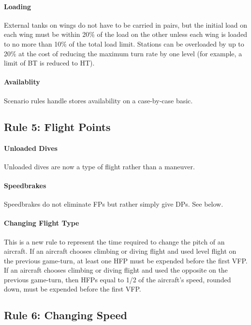 \documentclass[10pt]{article}
\begin{document}
\paragraph{Loading} External tanks on wings do not have to be carried in pairs, but the initial load on each wing must be within 20\% of the load on the other unless each wing is loaded to no more than 10\% of the total load limit. Stations can be overloaded by up to 20\% at the cost of reducing the maximum turn rate by one level (for example, a limit of BT is reduced to HT).

\paragraph{Availablity} Scenario rules handle stores availability on a case-by-case basic.

\subsection{Rule 5: Flight Points}

\paragraph{Unloaded Dives} Unloaded dives are now a type of flight rather than a maneuver.

\paragraph{Speedbrakes} Speedbrakes do not eliminate FPs but rather simply give DPs. See below.

\paragraph{Changing Flight Type} This is a new rule to represent the time required to change the pitch of an aircraft. If an aircraft chooses climbing or diving flight and used level flight on the previous game-turn, at least one HFP must be expended before the first VFP. If an aircraft chooses climbing or diving flight and used the opposite on the previous game-turn, then HFPs equal to 1/2 of the aircraft's speed, rounded down, must be expended before the first VFP. 

\subsection{Rule 6: Changing Speed}
\end{document}
